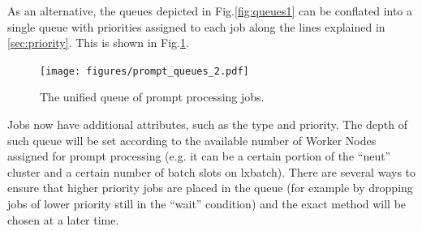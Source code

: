 \documentclass[pdftex,12pt,letter]{article}
\begin{document}
As an alternative, the queues depicted in Fig.\ref{fig:queues1} can be conflated into a single queue
with priorities assigned to each job along the lines explained in \ref{sec:priority}. This is shown in
Fig.\ref{fig:queues2}.
\begin{figure}[tbh]
  \centering
  \texttt{[image: figures/prompt\_queues\_2.pdf]}
  \caption{The unified queue of prompt processing jobs.}
  \label{fig:queues2}
\end{figure}
Jobs now have additional attributes, such as the type and priority.
The depth of such queue will be set according to the available number of Worker Nodes assigned for
prompt processing (e.g. it can be a certain portion of the ``neut'' cluster and a certain number of batch slots on
lxbatch). There are several ways to ensure that higher priority jobs are placed in the queue (for example by
dropping jobs of lower priority still in the ``wait'' condition) and the exact method will be chosen at a later time.
\end{document}
